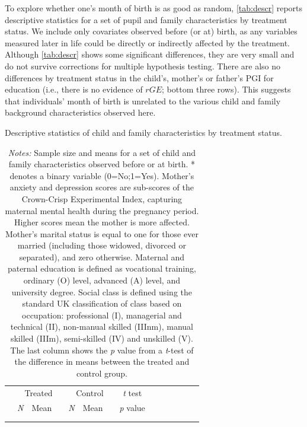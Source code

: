 \documentclass[12pt,a4paper]{article}
\begin{document}
\begin{bibunit}
To explore whether one's month of birth is as good as random, \autoref{tab:descr} reports descriptive statistics for a set of pupil and family characteristics by treatment status. We include only covariates observed before (or at) birth, as any variables measured later in life could be directly or indirectly affected by the treatment. Although \autoref{tab:descr} shows some significant differences, they are very small and do not survive corrections for multiple hypothesis testing. There are also no differences by treatment status in the child's, mother's or father's PGI for education (i.e., there is no evidence of $rGE$; bottom three rows). This suggests that individuals' month of birth is unrelated to the various child and family background characteristics observed here.

\begin{table}[H]
\footnotesize
\caption{\footnotesize Descriptive statistics of child and family characteristics by treatment status.}
\centering
\begin{tabular}{lccccccccccccc}
\toprule
&\multicolumn{3}{c}{Treated} &\multicolumn{3}{c}{Control}           &\multicolumn{1}{c}{\textit{t} test}           \\
& \textit{N} & Mean & & \textit{N} & Mean & & \textit{p} value \\
\midrule

\bottomrule \\
\addlinespace[-2.50ex]
\end{tabular}
\label{tab:descr}
\caption*{\footnotesize \noindent \textit{Notes:} Sample size and means for a set of child and family characteristics observed before or at birth. * denotes a binary variable (0=No;1=Yes). Mother's anxiety and depression scores are sub-scores of the Crown-Crisp Experimental Index, capturing maternal mental health during the pregnancy period. Higher scores mean the mother is more affected. Mother's marital status is equal to one for those ever married (including those widowed, divorced or separated), and zero otherwise. Maternal and paternal education is defined as vocational training, ordinary (O) level, advanced (A) level, and university degree. Social class is defined using the standard UK classification of class based on occupation: professional (I), managerial and technical (II), non-manual skilled (IIInm), manual skilled (IIIm), semi-skilled (IV) and unskilled (V). The last column shows the \textit{p} value from a \textit{t}-test of the difference in means between the treated and control group. }
\end{table}


\end{bibunit}
\end{document}
